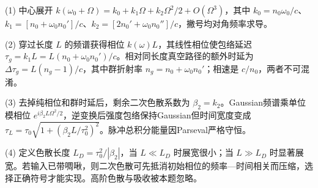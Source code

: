 (1) 中心展开 \(k(\omega_0+\Omega)=k_0+k_1\Omega+k_2\Omega^2/2+O(\Omega^3)\)，其中 \(k_0=n_0\omega_0/c\)、\(k_1=[n_0+\omega_0n_0']/c\)、\(k_2=[2n_0'+\omega_0n_0'']/c\)，撇号均对角频率求导。

(2) 穿过长度 \(L\) 的频谱获得相位 \(k(\omega)L\)，其线性相位使包络延迟 \(\tau_g=k_1L=L(n_0+\omega_0n_0')/c\)。相对同长度真空路径的额外时延为 \(\boxed{\Delta\tau_g=L(n_g-1)/c}\)，其中群折射率 \(n_g=n_0+\omega_0n_0'\)；相速是 \(c/n_0\)，两者不可混淆。

(3) 去掉纯相位和群时延后，剩余二次色散系数为 \(\beta_2=k_2\)。Gaussian频谱乘单位模相位 \(e^{i\beta_2L\Omega^2/2}\)，逆变换后强度包络保持Gaussian但时间宽度变成 \(\boxed{\tau_L=\tau_0\sqrt{1+(\beta_2L/\tau_0^2)^2}}\)。脉冲总积分能量因Parseval严格守恒。

(4) 定义色散长度 \(L_D=\tau_0^2/|\beta_2|\)，当 \(L\ll L_D\) 时展宽很小；当 \(L\gg L_D\) 时显著展宽。若输入已带啁啾，则二次色散可先抵消初始相位的频率—时间相关而压缩，选择正确符号才能实现。高阶色散与吸收被本题忽略。
